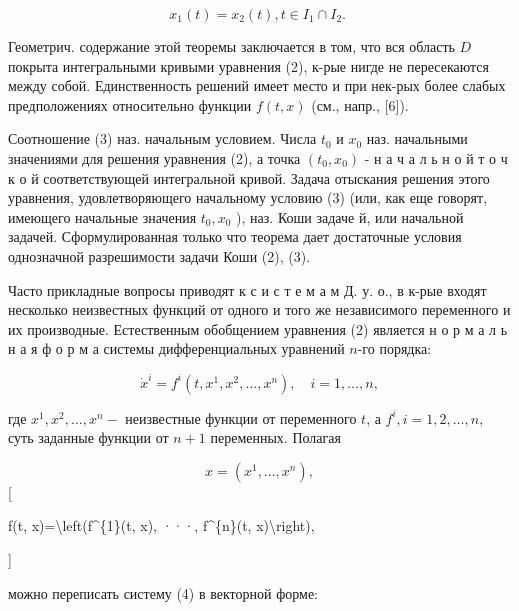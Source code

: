\documentclass[10pt]{article}
\begin{document}
\[

x_{1}(t)=x_{2}(t), t \in I_{1} \cap I_{2} \text {. }

\]



Геометрич. содержание этой теоремы заключается в том, что вся область $D$ покрыта интегральными кривыми уравнения (2), к-рые нигде не пересекаются между собой. Единственность решений имеет место и при нек-рых более слабых предположениях относительно функции $f(t, x)$ (см., напр., [6]).



Соотношение (3) наз. начальным условием. Числа $t_{0}$ и $x_{0}$ наз. начальными значениями для решения уравнения (2), а точка $\left(t_{0}, x_{0}\right)$ - н а ч а л ь н о й т о ч к о й соответствующей интегральной кривой. Задача отыскания решения этого уравнения, удовлетворяющего начальному условию (3) (или, как еще говорят, имеющего начальные значения $t_{0}, x_{0}$ ), наз. Коши задаче й, или начальной задачей. Сформулированная только что теорема дает достаточные условия однозначной разрешимости задачи Коши (2), (3).



Часто прикладные вопросы приводят к с и с т е м а м Д. у. о., в к-рые входят несколько неизвестных функций от одного и того же независимого переменного и их производные. Естественным обобщением уравнения (2) является н о р м а л ь н а я ф о р м а системы дифференциальных уравнений $n$-го порядка:



\[

\dot{x}^{i}=f^{i}\left(t, x^{1}, x^{2}, \ldots, x^{n}\right), \quad i=1, \ldots, n,

\]



где $x^{1}, x^{2}, \ldots, x^{n}-$ неизвестные функции от переменного $t$, а $f^{i}, i=1,2, \ldots, n$, суть заданные функции от $n+1$ переменных. Полагая



\[

x=\left(x^{1}, \ldots, x^{n}\right),

\][



f(t, x)=\textbackslash left(f\^{}\{1\}(t, x), ···, f\^{}\{n\}(t, x)\textbackslash right),

]



можно переписать систему (4) в векторной форме:
\end{document}
